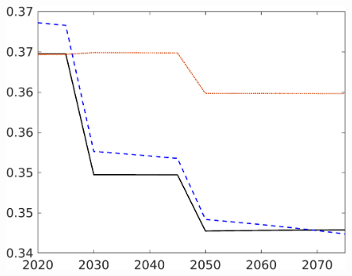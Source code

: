 \begin{figure}[h!!]
\begin{minipage}[]{0.32\textwidth}
	\end{minipage}
	\begin{minipage}[]{0.32\textwidth}
		\includegraphics[width=1\textwidth]{../../codding_model/own_basedOnFried/optimalPol_elastS_DisuSci/figures/all_1705/Ln_CompEffOPT_T_NoTaus_spillover0_noskill1_sep1_BN0_ineq0_red0_etaa0.79_lgd0.png}
	\end{minipage}
\end{figure}



